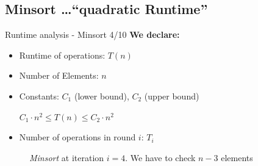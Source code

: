 \documentclass{beamer}
\begin{document}

\subsection{Minsort \ldots{}``quadratic Runtime''}


\begin{frame}{Runtime analysis - Minsort 4/10}
  \textbf{We declare:}
  \begin{itemize}
    \item Runtime of operations: $T(n)$
    \item Number of Elements: $n$
    \item Constants: $C_1$ ({\color{Hell-Gruen}lower bound}),
      $C_2$ ({\color{Hell-Gruen}upper bound})
    \begin{center}
      $C_{1} \cdot n^2
      \leq T(n)
      \leq C_{2} \cdot n^2$
    \end{center}
    \item Number of operations in round $i$: $T_i$
  \end{itemize}
  \begin{figure}[!h]
    \begin{adjustbox}{width=0.5\linewidth}
    \end{adjustbox}%
    \caption{\textit{Minsort} at iteration $i=4$. We have to check
      $n-3$ elements}%
    \label{fig:minsort_def}%
  \end{figure}
\end{frame}
\end{document}
